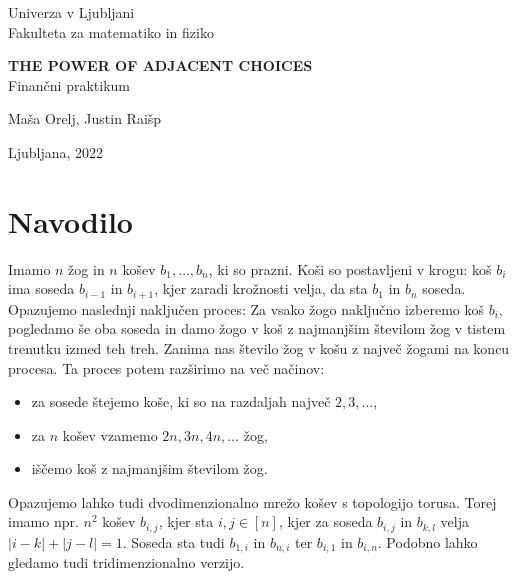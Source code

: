 \documentclass[a4paper, 11pt]{article}
\begin{document}
\thispagestyle{empty}
\begin{center}
\begin{minipage}{0.75\linewidth}
    \centering
    {\Large Univerza v Ljubljani \\ Fakulteta za matematiko in fiziko}
    \\
    \vspace{3cm}

    {\uppercase{\Large \textbf{The power of adjacent choices}}} \\ Finančni praktikum \\
    \vspace{3cm}

    {\Large Maša Orelj, Justin Raišp\par}
    \vspace{9cm}

    {\Large Ljubljana, 2022}
\end{minipage}
\end{center}

\newpage
 
\section{Navodilo}

Imamo $n$ žog in $n$ košev $b_1, \dots , b_n$, ki so prazni. Koši so postavljeni v krogu: koš $b_i$ ima soseda 
$b_{i-1}$ in $b_{i+1}$, kjer zaradi krožnosti velja, da sta $b_1$ in $b_n$ soseda.
Opazujemo naslednji naključen proces: Za vsako žogo naključno izberemo koš $b_i$, pogledamo še oba soseda in damo žogo 
v koš z najmanjšim številom žog v tistem trenutku izmed teh treh. Zanima nas število žog v košu z največ žogami na koncu procesa. 
Ta proces potem razširimo na več načinov:
\begin{itemize}
    \item za sosede štejemo koše, ki so na razdaljah največ $2, 3, \dots$,
    \item za $n$ košev vzamemo $2n, 3n, 4n, \dots$ žog,
    \item iščemo koš z najmanjšim številom žog.
\end{itemize}  
Opazujemo lahko tudi dvodimenzionalno mrežo košev s topologijo torusa. Torej imamo npr. $n^2$ košev $b_{i,j}$, kjer sta 
$i, j \in [n]$, kjer za soseda $b_{i,j}$ in $b_{k,l}$ velja $|i - k| + |j - l| = 1$. Soseda sta tudi
$b_{1,i}$ in $b_{n,i}$  ter $b_{i,1}$ in $b_{i,n}$. Podobno lahko gledamo tudi tridimenzionalno verzijo.
\end{document}
